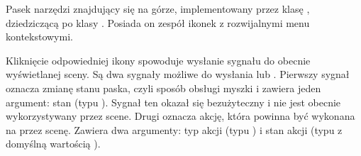\label{sec:sokar-dicomtoolbar}
\par
Pasek narzędzi znajdujący się na górze, implementowany przez klasę , dziedziczącą po klasy .
Posiada on zespół ikonek z rozwijalnymi menu kontekstowymi.

\par
Kliknięcie odpowiedniej ikony spowoduje wysłanie sygnału do obecnie wyświetlanej sceny.
Są dwa sygnały możliwe do wysłania  lub .
Pierwszy sygnał oznacza zmianę stanu paska, czyli sposób obsługi myszki i zawiera jeden argument: stan (typu ).
Sygnał ten okazał się bezużyteczny i nie jest obecnie wykorzystywany przez scene.
Drugi oznacza akcję, która powinna być wykonana na przez scenę.
Zawiera dwa argumenty: typ akcji (typu ) i stan akcji (typu  z domyślną wartością ).

